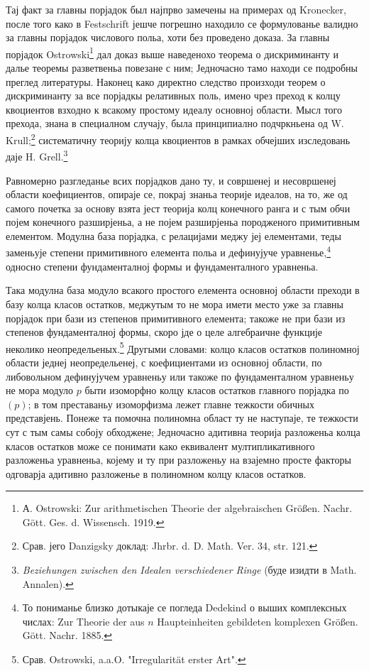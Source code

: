 \documentclass[11pt]{article}
\begin{document}
Тај факт за главны порјадок был најпрво замечены на примерах од Kronecker, после того како в Festschrift јешче погрешно находило се формулованье валидно за главны порјадок числового польа, хоти без проведено доказа. За главны порјадок Ostrowski\footnote{А. Ostrowski: Zur arithmetischen Theorie der algebraischen Größen. Nachr. Gött. Ges. d. Wissensch. 1919.} дал доказ выше наведенохо теорема о дискриминанту и далье теоремы разветвеньа повезане с ним; Једночасно тамо находи се подробны преглед литературы. Наконец како директно следство произходи теорем о дискриминанту за все порјадкы релативных поль, имено чрез преход к колцу квоциентов взходно к всакому простому идеалу основној области. Мысл того прехода, знана в специалном случају, была принципиално подчркньена од W. Krull;\footnote{Срав. јего Danzigsky доклад: Jhrbr. d. D. Math. Ver. 34, str. 121.} систематичну теорију колца квоциентов в рамках обчејших изследовань даје H. Grell.\footnote{\emph{Beziehungen zwischen den Idealen verschiedener Ringe} (буде изидти в Math. Annalen).}

Равномерно разгледанье всих порјадков дано ту, и совршенеј и несовршенеј области коефициентов, опираје се, покрај знаньа теорије идеалов, на то, же од самого почетка за основу взята јест теорија колц конечного ранга и с тым обчи појем конечного разширјеньа, а не појем разширјеньа породженого примитивным елементом. Модулна база порјадка, с релацијами меджу јеј елементами, теды заменьује степени примитивного елемента польа и дефинујуче уравненье,\footnote{То пониманье близко дотыкаје се погледа Dedekind о выших комплексных числах: Zur Theorie der aus $n$ Haupteinheiten gebildeten komplexen Größen. Gött. Nachr. 1885.} односно степени фундаменталној формы и фундаменталного уравненьа.

Така модулна база модуло всакого простого елемента основној области преходи в базу колца класов остатков, меджутым то не мора имети место уже за главны порјадок при бази из степенов примитивного елемента; такоже не при бази из степенов фундаменталној формы, скоро јде о целе алгебраичне функције неколико неопредельеных.\footnote{Срав. Ostrowski, a.a.O. "Irregularität erster Art".} Другыми словами: колцо класов остатков полиномној области једнеј неопредельенеј, с коефициентами из основној области, по либовольном дефинујучем уравненьу или такоже по фундаменталном уравненьу не мора модуло $p$ быти изоморфно колцу класов остатков главного порјадка по $(p)$; в том преставаньу изоморфизма лежет главне тежкости обичных представјень. Понеже та помочна полиномна област ту не наступаје, те тежкости сут с тым самы собоју обходжене; Једночасно адитивна теорија разложеньа колца класов остатков може се понимати како еквивалент мултипликативного разложеньа уравненьа, којему и ту при разложеньу на взајемно просте факторы одговарја адитивно разложенье в полиномном колцу класов остатков.
\end{document}
